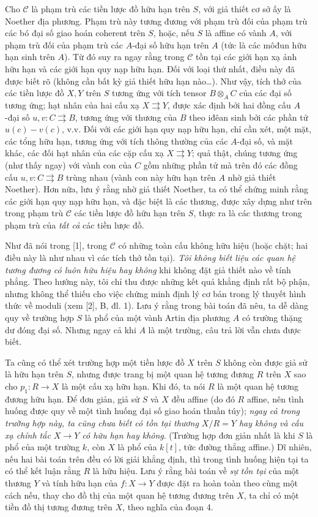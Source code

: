 \documentclass[11pt,twoside,openany]{book}
\numberwithin{equation}{section}
\newcommand{\src}[1]{%
  \phantomsection\hypertarget{src:\fgasourceid:#1}{}%
  \marginpar{\raggedleft\footnotesize\sffamily #1}%
}
\newcommand{\fgasourceid}{unset}
\begin{document}
Cho $\mathcal C$ là phạm trù các tiền lược đồ hữu hạn trên $S$, với giả thiết
cơ sở ấy là Noether địa phương. Phạm trù này tương đương với phạm trù đối của phạm
trù các bó đại số giao hoán coherent trên $S$, hoặc, nếu $S$ là affine có
vành $A$, với phạm trù đối của phạm trù các $A$-đại số hữu hạn trên $A$ (tức
là các môđun hữu hạn sinh trên $A$). Từ đó suy ra ngay rằng trong $\mathcal C$
tồn tại các giới hạn xạ ảnh hữu hạn và các giới hạn quy nạp hữu hạn. Đối với
loại thứ nhất, điều này đã được biết rõ (không cần bất kỳ giả thiết hữu hạn
nào\ldots). Như vậy, tích thớ của các tiền lược đồ $X,Y$ trên $S$ tương ứng
với tích tensor $B\otimes_A C$ của các đại số tương ứng; hạt nhân của hai cấu
xạ $X\rightrightarrows Y$, được xác định bởi hai đồng cấu $A$-đại số
$u,v:C\rightrightarrows B$, tương ứng với thương của $B$ theo iđêan sinh bởi
các phần tử $u(c)-v(c)$, v.v. Đối với các giới hạn quy nạp hữu hạn, chỉ cần
xét, một mặt, các tổng hữu hạn, tương ứng với tích thông thường của các
$A$-đại số, và mặt khác, các đối hạt nhân của các cặp cấu xạ
$X\rightrightarrows Y$; quả thật, chúng tương ứng (như thấy ngay) với vành con
của $C$ gồm những phần tử mà trên đó các đồng cấu
$u,v:C\rightrightarrows B$ trùng nhau (vành con này hữu hạn trên $A$ nhờ giả
thiết Noether). Hơn nữa, lưu ý rằng nhờ giả thiết Noether, ta có thể chứng
minh rằng các giới hạn quy nạp hữu hạn, và đặc biệt là các thương, được xây
dựng như trên trong phạm trù $\mathcal C$ các tiền lược đồ hữu hạn trên $S$,
thực ra là các thương trong phạm trù của \emph{tất cả} các tiền lược đồ.
\src{103}
Như đã nói trong [1], trong $\mathcal C$ có những toàn cấu không hữu hiệu
(hoặc chặt; hai điều này là như nhau vì
các tích thớ tồn tại). \emph{Tôi không biết liệu các quan hệ tương đương có
luôn hữu hiệu hay không} khi không đặt giả thiết nào về tính phẳng. Theo hướng
này, tôi chỉ thu được những kết quả khẳng định rất bộ phận, nhưng không thể
thiếu cho việc chứng minh định lý cơ bản trong lý thuyết hình thức về moduli
(xem [2], B, đl. 1). Lưu ý rằng trong bài toán đã nêu, ta dễ dàng quy về
trường hợp $S$ là phổ của một vành Artin địa phương $A$ có trường thặng dư
đóng đại số. Nhưng ngay cả khi $A$ là một trường, câu trả lời vẫn chưa được
biết.

Ta cũng có thể xét trường hợp một tiền lược đồ $X$ trên $S$ không còn được
giả sử là hữu hạn trên $S$, nhưng được trang bị một quan hệ tương đương $R$
trên $X$ sao cho $p_1:R\longrightarrow X$ là một cấu xạ hữu hạn. Khi đó, ta
nói $R$ là một quan hệ tương đương hữu hạn. Để đơn giản, giả sử $S$ và $X$
đều affine (do đó $R$ affine, nên tình huống được quy về một tình huống đại số
giao hoán thuần túy); \emph{ngay cả trong trường hợp này, ta cũng chưa biết có
tồn tại thương $X/R=Y$ hay không và cấu xạ chính tắc
$X\longrightarrow Y$ có hữu hạn hay không}. (Trường hợp đơn giản nhất là khi
$S$ là phổ của một trường $k$, còn $X$ là phổ của $k[t]$, tức đường thẳng
affine.) Dĩ nhiên, nếu hai bài toán trên đều có lời giải khẳng định, thì trong
tình huống hiện tại ta có thể kết luận rằng $R$ là hữu hiệu. Lưu ý rằng bài
toán về \emph{sự tồn tại} của một thương $Y$ và tính hữu hạn của
$f:X\longrightarrow Y$ được đặt ra hoàn toàn theo cùng một cách nếu, thay cho
đồ thị của một quan hệ tương đương trên $X$, ta chỉ có một tiền đồ thị tương
đương trên $X$, theo nghĩa của đoạn 4.
\end{document}
